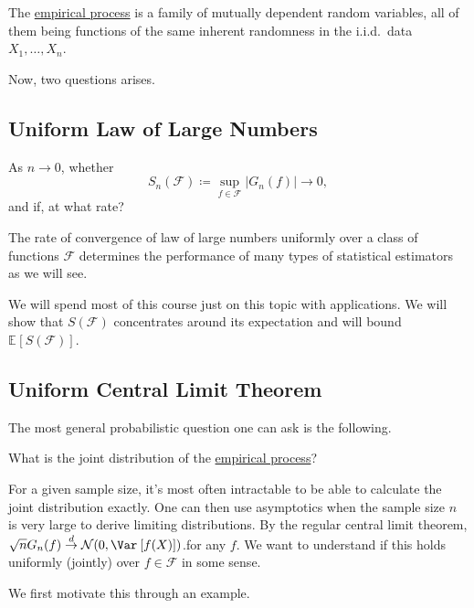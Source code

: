 \begin{remark}
	The \hyperref[def:empirical-process]{empirical process} is a family of mutually dependent random variables, all of them being functions of the same inherent randomness in the i.i.d.\ data \(X_1, \dots , X_n \).
\end{remark}

Now, two questions arises.

\subsection{Uniform Law of Large Numbers}
As \(n \to 0\), whether
\[
	S_n(\mathscr{F} ) \coloneqq \sup _{f\in \mathscr{F} } \vert G_n(f) \vert \to 0,
\]
and if, at what rate?

\begin{remark}
	The rate of convergence of law of large numbers uniformly over a class of functions \(\mathscr{F} \) determines the performance of many types of statistical estimators as we will see.
\end{remark}

We will spend most of this course just on this topic with applications. We will show that \(S(\mathscr{F} )\) concentrates around its expectation and will bound \(\mathbb{E}_{}\left[S(\mathscr{F} ) \right] \).

\subsection{Uniform Central Limit Theorem}
The most general probabilistic question one can ask is the following.

\begin{problem*}
	What is the joint distribution of the \hyperref[def:empirical-process]{empirical process}?
\end{problem*}
\begin{answer}
	For a given sample size, it's most often intractable to be able to calculate the joint distribution exactly. One can then use asymptotics when the sample size \(n\) is very large to derive limiting distributions. By the regular central limit theorem, \(\sqrt{n} G_n(f) \overset{d}{\to} \mathcal{N} (0, \Var_{}\left[f(X) \right] )\).for any \(f\). We want to understand if this holds uniformly (jointly) over \(f\in \mathscr{F} \) in some sense.
\end{answer}

We first motivate this through an example.

